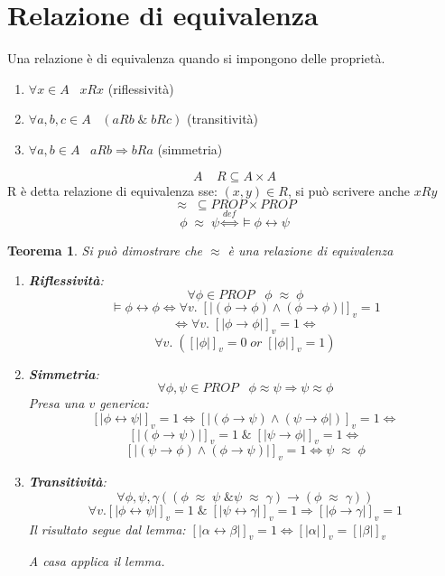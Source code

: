 \documentclass{article}
\newtheorem{theorem}{Teorema}
\theoremstyle{break}
\theoremstyle{break}
\theoremstyle{break}
\theoremstyle{break}
\begin{document}
\section{Relazione di equivalenza}
Una relazione è di equivalenza quando si impongono delle proprietà.
\begin{enumerate}
    \item \( \forall x \in A\;\;\; xRx \) (riflessività)
    \item \( \forall a,b,c \in A\;\;\; (aRb\;\&\;bRc) \) (transitività)
    \item \( \forall a,b \in A\;\;\; aRb  \Rightarrow bRa \) (simmetria)
\end{enumerate}
\[
A\;\;\;\; R \subseteq A \times A
\] 
R è detta relazione di equivalenza sse: \( (x,y) \in R \), si può scrivere anche \( xRy \)  
\[
\approx \; \subseteq PROP \times PROP
\] 
\[
    \phi\;\approx\;\psi \stackrel{def}{\Leftrightarrow} \models \phi \leftrightarrow \psi
\] 
\begin{theorem}
    Si può dimostrare che \( \approx \) è una relazione di equivalenza
    \begin{enumerate}
        \item \textbf{Riflessività}: \[
                \forall \phi \in PROP \;\;\; \phi\; \approx \; \phi \] 
            \[
                \models \phi \leftrightarrow \phi \Leftrightarrow \forall v.\; [|(\phi \to \phi) \wedge (\phi \to \phi)|]_v = 1
            \]\[
            \Leftrightarrow \forall v.\; [|\phi \to \phi|]_v = 1 \Leftrightarrow
            \]  
            \[
                \forall v.\; ([|\phi|]_v=0\; or\; [|\phi|]_v=1)
            \] 
       \item \textbf{Simmetria}: \[
       \forall \phi,\psi \in  PROP\;\;\; \phi \approx \psi \Rightarrow \psi \approx \phi
       \] 
       Presa una \( v \) generica:
       \[
           [|\phi \leftrightarrow \psi|]_v = 1 \Leftrightarrow [|(\phi \to \psi) \wedge (\psi \to \phi|)]_v=1 \Leftrightarrow 
       \] 
       \[
           [|(\phi \to  \psi)|]_v=1\; \&\; [|\psi \to \phi|]_v=1 \Leftrightarrow
       \] 
        \[
        [|(\psi \to \phi) \wedge (\phi \to \psi)|]_v=1 \Leftrightarrow \psi\; \approx\; \phi
        \] 

        \item \textbf{Transitività}: \[
                \forall \phi,\psi,\gamma ((\phi\; \approx\; \psi\; \& \psi\; \approx\; \gamma) \to (\phi\; \approx\; \gamma)) 
        \] 
        \[
            \forall v. [|\phi \leftrightarrow \psi|]_v=1 \;\&\; [|\psi \leftrightarrow \gamma|]_v=1 \Rightarrow [|\phi \to \gamma|]_v=1
        \] 
        Il risultato segue dal lemma: \( [|\alpha \leftrightarrow \beta|]_v=1 \Leftrightarrow [|\alpha|]_v=[|\beta|]_v \) 
        
        A casa applica il lemma.
    \end{enumerate}
\end{theorem}
\end{document}
